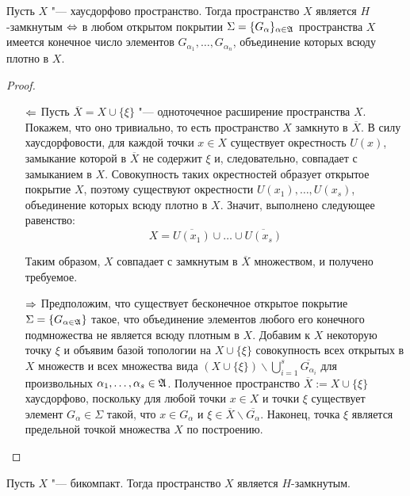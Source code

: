 \begin{theorem}\label{hcriterion}
    Пусть $X$ "--- хаусдорфово пространство. Тогда пространство $X$ является $H$-замкнутым $\Leftrightarrow$ в любом открытом покрытии $\Sigma = \lbrace G_\alpha\rbrace_{\alpha \in \mathfrak A}$ пространства $X$ имеется конечное число элементов $G_{\alpha_1}, \ldots, G_{\alpha_n}$, объединение которых всюду плотно в $X$.
\end{theorem}

\begin{proof}~
    \begin{itemize}
        \item[$\Leftarrow$] Пусть $\overline{X} = X \cup \{\xi\}$ "--- одноточечное расширение пространства $X$. Покажем, что оно тривиально, то есть пространство $X$ замкнуто в $\overline{X}$. В силу хаусдорфовости, для каждой точки $x \in X$ существует окрестность $U(x)$, замыкание которой в $\overline{X}$ не содержит $\xi$ и, следовательно, совпадает с замыканием в $X$. Совокупность таких окрестностей образует открытое покрытие $X$, поэтому существуют окрестности $U(x_1), \ldots, U(x_s)$, объединение которых всюду плотно в $X$. Значит, выполнено следующее равенство:
        \[X = \overline{U(x_1)}\cup\ldots\cup\overline{U(x_s)}\]
        
        Таким образом, $X$ совпадает с замкнутым в $\overline{X}$ множеством, и получено требуемое.

        \item[$\Rightarrow$] Предположим, что существует бесконечное открытое покрытие $\Sigma = \lbrace G_{\alpha \in \mathfrak A }\rbrace$ такое, что объединение элементов любого его конечного подмножества не является всюду плотным в $X$. Добавим к $X$ некоторую точку $\xi$ и объявим базой топологии на $X \cup \{\xi\}$ совокупность всех открытых в $X$ множеств и всех множества вида $(X \cup \lbrace \xi\rbrace) \backslash \bigcup_{i=1}^s\overline{G_{\alpha_i}}$ для произвольных $\alpha_1, \dotsc, \alpha_s \in \mathfrak A$. Полученное пространство $\overline{X} := X \cup \{\xi\}$ хаусдорфово, поскольку для любой точки $x \in X$ и точки $\xi$ существует элемент $G_\alpha \in \Sigma$ такой, что $x \in G_\alpha$ и $\xi \in \overline{X}\backslash \overline{G_\alpha}$. Наконец, точка $\xi$ является предельной точкой множества $X$ по построению.\qedhere
    \end{itemize}
\end{proof}

\begin{theorem}\label{theorem1}
    Пусть $X$ "--- бикомпакт. Тогда пространство $X$ является $H$-замкнутым.
\end{theorem}

